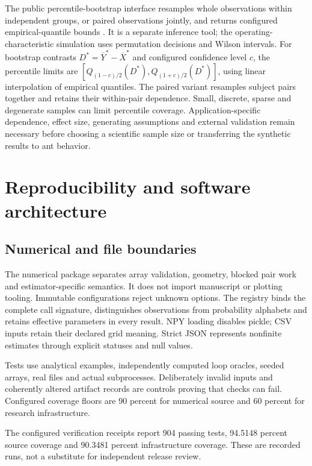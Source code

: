 \documentclass[
  english,
  11pt,
]{article}
\begin{document}
\endgroup

The public percentile-bootstrap interface resamples whole observations
within independent groups, or paired observations jointly, and returns
configured empirical-quantile bounds \citep{efron1979bootstrap}. It is a
separate inference tool; the operating-characteristic simulation uses
permutation decisions and Wilson intervals. For bootstrap contrasts
\(D^*=\overline Y^*-\overline X^*\) and configured confidence level
\(c\), the percentile limits are
\([Q_{(1-c)/2}(D^*),Q_{(1+c)/2}(D^*)]\), using linear interpolation of
empirical quantiles. The paired variant resamples subject pairs together
and retains their within-pair dependence. Small, discrete, sparse and
degenerate samples can limit percentile coverage. Application-specific
dependence, effect size, generating assumptions and external validation
remain necessary before choosing a scientific sample size or
transferring the synthetic results to ant behavior.

\section{Reproducibility and software
architecture}\label{sec:reproducibility}

\subsection{Numerical and file
boundaries}\label{numerical-and-file-boundaries}

The numerical package separates array validation, geometry, blocked pair
work and estimator-specific semantics. It does not import manuscript or
plotting tooling. Immutable configurations reject unknown options. The
registry binds the complete call signature, distinguishes observations
from probability alphabets and retains effective parameters in every
result. NPY loading disables pickle; CSV inputs retain their declared
grid meaning. Strict JSON represents nonfinite estimates through
explicit statuses and null values.

Tests use analytical examples, independently computed loop oracles,
seeded arrays, real files and actual subprocesses. Deliberately invalid
inputs and coherently altered artifact records are controls proving that
checks can fail. Configured coverage floors are 90 percent for numerical
source and 60 percent for research infrastructure.

The configured verification receipts report 904 passing tests, 94.5148
percent source coverage and 90.3481 percent infrastructure coverage.
These are recorded runs, not a substitute for independent release
review.
\end{document}
